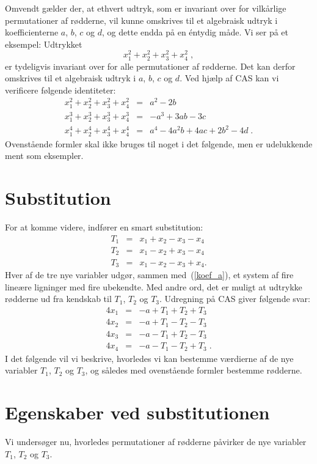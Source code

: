 \documentclass[12pt,oneside,a4paper]{article}
\newcommand{\bea}{\begin{eqnarray}}
\newcommand{\eea}{\end{eqnarray}}
\begin{document}
Omvendt gælder der, at ethvert udtryk, som er invariant over for vilkårlige
permutationer af rødderne, vil kunne omskrives til et algebraisk udtryk i 
koefficienterne $a$, $b$, $c$ og $d$, og dette endda på en éntydig måde. Vi ser
på et eksempel:
Udtrykket
\begin{equation}
    x_1^2 + x_2^2 + x_3^2 + x_4^2\;,
\end{equation}
er tydeligvis invariant over for alle permutationer af rødderne. Det kan derfor
omskrives til et algebraisk udtryk i $a$, $b$, $c$ og $d$.
Ved hjælp af CAS kan vi verificere følgende identiteter:
\bea
    x_1^2 + x_2^2 + x_3^2 + x_4^2 &=& a^2 - 2b \\
    x_1^3 + x_2^3 + x_3^3 + x_4^3 &=& -a^3 + 3ab - 3c \\
    x_1^4 + x_2^4 + x_3^4 + x_4^4 &=& a^4 - 4a^2b + 4ac + 2b^2 - 4d \;.
\eea
Ovenstående formler skal ikke bruges til noget i det følgende, men er 
udelukkende ment som eksempler.

\section{Substitution}
For at komme videre, indfører en smart substitution:
\bea
    T_1 &=& x_1 + x_2 - x_3 - x_4 \label{subst_t1}\\
    T_2 &=& x_1 - x_2 + x_3 - x_4 \label{subst_t2}\\
    T_3 &=& x_1 - x_2 - x_3 + x_4 \label{subst_t3}.
\eea
Hver af de tre nye variabler udgør, sammen med~(\ref{koef_a}), et system af
fire lineære ligninger med fire ubekendte.  Med andre ord, det er muligt at
udtrykke rødderne ud fra kendskab til $T_1$, $T_2$ og $T_3$.  Udregning på CAS
giver følgende svar:
\bea
    4x_1 &=& -a + T_1 + T_2 + T_3 \label{x1} \\
    4x_2 &=& -a + T_1 - T_2 - T_3 \label{x2} \\
    4x_3 &=& -a - T_1 + T_2 - T_3 \label{x3} \\
    4x_4 &=& -a - T_1 - T_2 + T_3 \label{x4} \;.
\eea
I det følgende vil vi beskrive, hvorledes vi kan bestemme værdierne af de nye
variabler $T_1$, $T_2$ og $T_3$, og således med ovenstående formler bestemme
    rødderne.

\section{Egenskaber ved substitutionen}
Vi undersøger nu, hvorledes permutationer af rødderne påvirker de nye variabler
$T_1$, $T_2$ og $T_3$.
\end{document}
